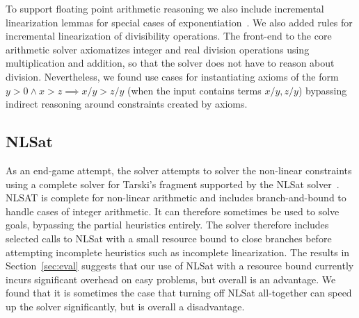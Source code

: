 To support floating point arithmetic reasoning
we also include incremental linearization lemmas for special
cases of exponentiation~\cite{DBLP:journals/tocl/CimattiGIRS18}. 
We also added rules for incremental linearization of divisibility operations. 
The front-end to the core arithmetic solver axiomatizes integer and real division operations using multiplication and addition,
so that the solver does not have to reason about division. Nevertheless, we found use cases for
instantiating axioms of the form $y > 0 \land x > z \implies x/y > z/y$ (when the input contains terms $x/y, z/y$)
bypassing indirect reasoning around constraints created by axioms.



\subsection{NLSat}
As an end-game attempt, the solver attempts to solver the non-linear constraints using a complete solver
for Tarski's fragment supported by the NLSat solver~\cite{JovanovicM12}. NLSAT is complete for non-linear arithmetic
and includes branch-and-bound to handle cases of integer arithmetic. It can therefore sometimes be used to solve
goals, bypassing the partial heuristics entirely. The solver therefore includes selected calls to NLSat with a small
resource bound to close branches before attempting incomplete heuristics such as incomplete linearization.
The results in Section~\ref{sec:eval} suggests that our use of NLSat with a resource bound currently incurs
significant overhead on easy problems, but overall is an advantage. We found that it is sometimes the case that turning off NLSat
all-together can speed up the solver significantly, but is overall a disadvantage.

